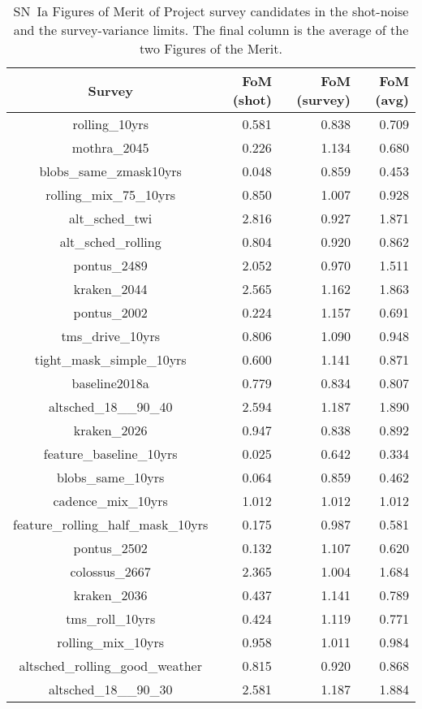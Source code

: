 \begin{table}
\caption{SN~Ia Figures of Merit of Project survey candidates
in  the shot-noise and the survey-variance limits.  The final column is the average
of the two Figures of the Merit.\label{table:ref}}
\centering
\begin{tabular}{|c|rrr|}
\hline
Survey & FoM (shot) & FoM (survey) & FoM (avg)\\
\hline
rolling\_10yrs  & 0.581 & 0.838 & 0.709  \\
mothra\_2045  & 0.226 & 1.134 & 0.680  \\
blobs\_same\_zmask10yrs  & 0.048 & 0.859 & 0.453  \\
rolling\_mix\_75\_10yrs  & 0.850 & 1.007 & 0.928  \\
alt\_sched\_twi  & 2.816 & 0.927 & 1.871  \\
alt\_sched\_rolling  & 0.804 & 0.920 & 0.862  \\
pontus\_2489  & 2.052 & 0.970 & 1.511  \\
kraken\_2044  & 2.565 & 1.162 & 1.863  \\
pontus\_2002  & 0.224 & 1.157 & 0.691  \\
tms\_drive\_10yrs  & 0.806 & 1.090 & 0.948  \\
tight\_mask\_simple\_10yrs  & 0.600 & 1.141 & 0.871  \\
baseline2018a  & 0.779 & 0.834 & 0.807  \\
altsched\_18\_\_90\_40  & 2.594 & 1.187 & 1.890  \\
kraken\_2026  & 0.947 & 0.838 & 0.892  \\
feature\_baseline\_10yrs  & 0.025 & 0.642 & 0.334  \\
blobs\_same\_10yrs  & 0.064 & 0.859 & 0.462  \\
cadence\_mix\_10yrs  & 1.012 & 1.012 & 1.012  \\
feature\_rolling\_half\_mask\_10yrs  & 0.175 & 0.987 & 0.581  \\
pontus\_2502  & 0.132 & 1.107 & 0.620  \\
colossus\_2667  & 2.365 & 1.004 & 1.684  \\
kraken\_2036  & 0.437 & 1.141 & 0.789  \\
tms\_roll\_10yrs  & 0.424 & 1.119 & 0.771  \\
rolling\_mix\_10yrs  & 0.958 & 1.011 & 0.984  \\
altsched\_rolling\_good\_weather  & 0.815 & 0.920 & 0.868  \\
altsched\_18\_\_90\_30  & 2.581 & 1.187 & 1.884  \\

\end{tabular}
\end{table}
